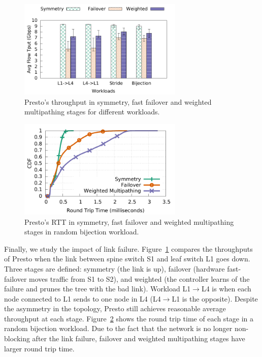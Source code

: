 
\begin{figure}[!t]
        \centering
  \includegraphics[width=0.7\textwidth]{presto/figures/failure_handling/failover_compare_tput_witherrbar.pdf}
        \caption{Presto's throughput in symmetry, fast failover and weighted multipathing stages for different workloads.}
        \label{failover_compare_tput}
\end{figure}

\begin{figure}[!t]
        \centering
  \includegraphics[width=0.7\textwidth]{presto/figures/failure_handling/failover_compare_sockperf_bijection_mice.pdf}
        \caption{Presto's RTT in symmetry, fast failover and weighted multipathing stages in  random bijection workload.}
        \label{failover_compare_sockperf_bijection}
\end{figure}

Finally, we study the impact of link failure.
Figure~\ref{failover_compare_tput} compares the throughputs of
Presto when %
the link between spine switch S1 and leaf switch L1 goes down.
Three stages are defined: symmetry (the link is up), failover (hardware fast-failover moves traffic from S1 to S2), and weighted (the controller
learns of the failure and prunes the tree with the bad link).
Workload L1$\rightarrow$L4 is when each node connected to L1 sends to one node in L4 (L4$\rightarrow$L1 is the opposite).
Despite the asymmetry in the topology, Presto still achieves reasonable average throughput at 
each stage.
Figure~\ref{failover_compare_sockperf_bijection} shows the round trip time of
each stage in a random bijection workload. 
Due to the fact that the network is no longer non-blocking after the link failure,
failover and weighted multipathing stages have larger round trip time.



